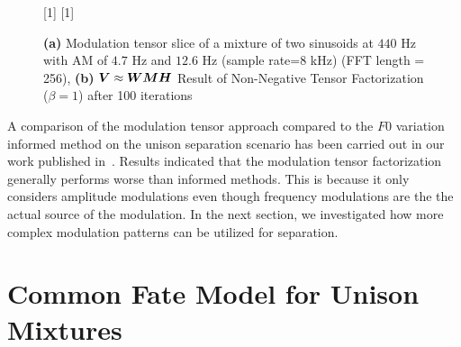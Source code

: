 \begin{figure}[!h]
\centering
[1\textwidth]{}%
\hspace{0.3\textwidth} %
[1\textwidth]{}%
\caption{\textbf{(a)} Modulation tensor slice of a mixture of two sinusoids at $440$ Hz with AM of $4.7$ Hz and $12.6$ Hz (sample rate=$8$ kHz)  (FFT length = 256), \textbf{(b)}  ${\bm{V}} \approx {\bm{W}} {\bm{M}} {\bm{H}}$ Result of Non-Negative Tensor Factorization ($\beta = 1$) after 100 iterations}
\label{fig:am_ntf}
\end{figure}
\par
A comparison of the modulation tensor approach compared to the \(F0\) variation informed method on the unison separation scenario has been carried out in our work published in~\cite{stoeter14}.
Results indicated that the modulation tensor factorization generally performs worse than informed methods.
This is because it only considers amplitude modulations even though frequency modulations are the
the actual source of the modulation.
In the next section, we investigated how more complex modulation patterns can be utilized for separation.

\section{Common Fate Model for Unison Mixtures}%
\label{sec:the_common_fate_model_for_unison_mixtures}


